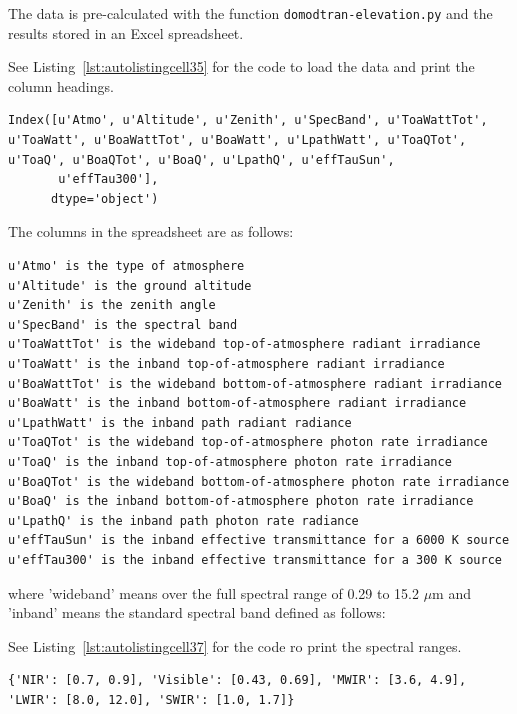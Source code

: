 \documentclass{workpackage}
\begin{document}
The data is pre-calculated with the function \verb+domodtran-elevation.py+ and the results stored in an Excel spreadsheet.




See Listing~\ref{lst:autolistingcell35} for the code to load the data and print the column headings.


\begin{lstlisting}[style=outcellstyle]
Index([u'Atmo', u'Altitude', u'Zenith', u'SpecBand', u'ToaWattTot', u'ToaWatt', u'BoaWattTot', u'BoaWatt', u'LpathWatt', u'ToaQTot', u'ToaQ', u'BoaQTot', u'BoaQ', u'LpathQ', u'effTauSun',
       u'effTau300'],
      dtype='object')

\end{lstlisting}

The columns in the spreadsheet are as follows:


\begin{verbatim}
u'Atmo' is the type of atmosphere
u'Altitude' is the ground altitude
u'Zenith' is the zenith angle
u'SpecBand' is the spectral band 
u'ToaWattTot' is the wideband top-of-atmosphere radiant irradiance
u'ToaWatt' is the inband top-of-atmosphere radiant irradiance
u'BoaWattTot' is the wideband bottom-of-atmosphere radiant irradiance
u'BoaWatt' is the inband bottom-of-atmosphere radiant irradiance
u'LpathWatt' is the inband path radiant radiance
u'ToaQTot' is the wideband top-of-atmosphere photon rate irradiance
u'ToaQ' is the inband top-of-atmosphere photon rate irradiance
u'BoaQTot' is the wideband bottom-of-atmosphere photon rate irradiance
u'BoaQ' is the inband bottom-of-atmosphere photon rate irradiance
u'LpathQ' is the inband path photon rate radiance
u'effTauSun' is the inband effective transmittance for a 6000 K source
u'effTau300' is the inband effective transmittance for a 300 K source
\end{verbatim}


where 'wideband' means over the full spectral range of 0.29 to 15.2 $\mu$m and 'inband' means the standard spectral band defined as follows:




See Listing~\ref{lst:autolistingcell37} for the code ro print the spectral ranges.


\begin{lstlisting}[style=outcellstyle]
{'NIR': [0.7, 0.9], 'Visible': [0.43, 0.69], 'MWIR': [3.6, 4.9], 'LWIR': [8.0, 12.0], 'SWIR': [1.0, 1.7]}

\end{lstlisting}
\end{document}
